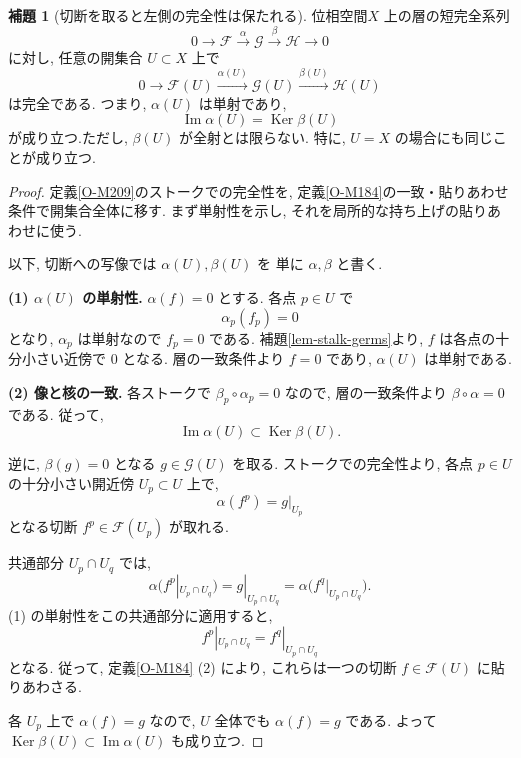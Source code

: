 \documentclass[dvipdfmx,a4paper,11pt]{article} %
\theoremstyle{definition}
\numberwithin{equation}{section}
\newtheorem{lem}[thm]{補題}
\begin{document}
\begin{lem}[切断を取ると左側の完全性は保たれる]\label{O-M213}
位相空間$X$ 上の層の短完全系列
\[
0\longrightarrow\mathcal F
\xrightarrow{\alpha}\mathcal G
\xrightarrow{\beta}\mathcal H
\longrightarrow0
\]
に対し, 任意の開集合 $U\subset X$ 上で
\[
0\longrightarrow\mathcal F(U)
\xrightarrow{\alpha(U)}\mathcal G(U)
\xrightarrow{\beta(U)}\mathcal H(U)
\]
は完全である.
つまり, $\alpha(U)$ は単射であり, 
\[
\operatorname{Im}\alpha(U)=\operatorname{Ker}\beta(U)
\]
が成り立つ.ただし, $\beta(U)$ が全射とは限らない.
特に, $U=X$ の場合にも同じことが成り立つ.
\end{lem}

\begin{proof}
定義\ref{O-M209}のストークでの完全性を, 定義\ref{O-M184}の一致・貼りあわせ条件で開集合全体に移す. まず単射性を示し, それを局所的な持ち上げの貼りあわせに使う.

以下, 切断への写像では $\alpha(U),\beta(U)$ を
単に $\alpha,\beta$ と書く.

\textbf{(1) $\alpha(U)$ の単射性.}
$\alpha(f)=0$ とする.
各点 $p\in U$ で
\[
\alpha_p(f_p)=0
\]
となり, $\alpha_p$ は単射なので $f_p=0$ である.
補題\ref{lem-stalk-germs}より, $f$ は各点の十分小さい近傍で $0$ となる.
層の一致条件より $f=0$ であり, $\alpha(U)$ は単射である.

\medskip
\noindent
\textbf{(2) 像と核の一致.}
各ストークで $\beta_p\circ\alpha_p=0$ なので, 
層の一致条件より $\beta\circ\alpha=0$ である.
従って, 
\[
\operatorname{Im}\alpha(U)\subset\operatorname{Ker}\beta(U).
\]

逆に, $\beta(g)=0$ となる $g\in\mathcal G(U)$ を取る.
ストークでの完全性より, 各点 $p\in U$ の十分小さい開近傍
$U_p\subset U$ 上で, 
\[
\alpha(f^p)=g|_{U_p}
\]
となる切断 $f^p\in\mathcal F(U_p)$ が取れる.

共通部分 $U_p\cap U_q$ では, 
\[
\alpha\bigl(f^p|_{U_p\cap U_q}\bigr)
=g|_{U_p\cap U_q}
=\alpha\bigl(f^q|_{U_p\cap U_q}\bigr).
\]
(1) の単射性をこの共通部分に適用すると, 
\[
f^p|_{U_p\cap U_q}=f^q|_{U_p\cap U_q}
\]
となる.
従って, 定義\ref{O-M184} (2) により, これらは一つの切断 $f\in\mathcal F(U)$ に貼りあわさる.

各 $U_p$ 上で $\alpha(f)=g$ なので, $U$ 全体でも
$\alpha(f)=g$ である.
よって $\operatorname{Ker}\beta(U)\subset\operatorname{Im}\alpha(U)$
も成り立つ.
\end{proof}
\end{document}
